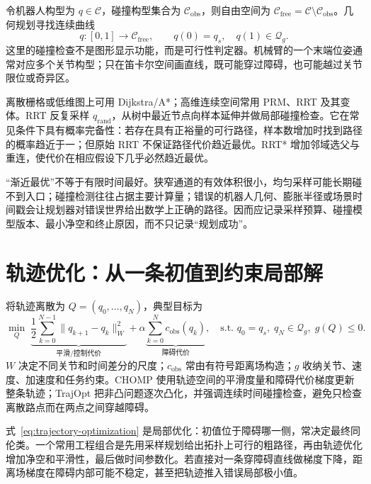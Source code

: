 令机器人构型为 $q\in\mathcal C$，碰撞构型集合为 $\mathcal C_{\mathrm{obs}}$，则自由空间为 $\mathcal C_{\mathrm{free}}=\mathcal C\setminus\mathcal C_{\mathrm{obs}}$。几何规划寻找连续曲线
\begin{equation}
q:[0,1]\rightarrow\mathcal C_{\mathrm{free}},\qquad q(0)=q_s,\quad q(1)\in\mathcal Q_g.
\label{eq:geometric-path}
\end{equation}
这里的碰撞检查不是图形显示功能，而是可行性判定器。机械臂的一个末端位姿通常对应多个关节构型；只在笛卡尔空间画直线，既可能穿过障碍，也可能越过关节限位或奇异区。

离散栅格或低维图上可用 Dijkstra/A*；高维连续空间常用 PRM、RRT 及其变体。RRT 反复采样 $q_{\mathrm{rand}}$，从树中最近节点向样本延伸并做局部碰撞检查。它在常见条件下具有概率完备性：若存在具有正裕量的可行路径，样本数增加时找到路径的概率趋近于一；但原始 RRT 不保证路径代价趋近最优。RRT* 增加邻域选父与重连，使代价在相应假设下几乎必然趋近最优\cite{karaman2011sampling}。

“渐近最优”不等于有限时间最好。狭窄通道的有效体积很小，均匀采样可能长期碰不到入口；碰撞检测往往占据主要计算量；错误的机器人几何、膨胀半径或场景时间戳会让规划器对错误世界给出数学上正确的路径。因而应记录采样预算、碰撞模型版本、最小净空和终止原因，而不只记录“规划成功”。

\section{轨迹优化：从一条初值到约束局部解}

将轨迹离散为 $Q=(q_0,\ldots,q_N)$，典型目标为
\begin{equation}
\min_Q\;\underbrace{\frac12\sum_{k=0}^{N-1}\|q_{k+1}-q_k\|_W^2}_{\text{平滑/控制代价}}
+\alpha\underbrace{\sum_{k=0}^{N}c_{\mathrm{obs}}(q_k)}_{\text{障碍代价}},
\quad\text{s.t. }q_0=q_s,\;q_N\in\mathcal Q_g,\;g(Q)\le0.
\label{eq:trajectory-optimization}
\end{equation}
$W$ 决定不同关节和时间差分的尺度；$c_{\mathrm{obs}}$ 常由有符号距离场构造；$g$ 收纳关节、速度、加速度和任务约束。CHOMP 使用轨迹空间的平滑度量和障碍代价梯度更新整条轨迹\cite{ratliff2009chomp}；TrajOpt 把非凸问题逐次凸化，并强调连续时间碰撞检查，避免只检查离散路点而在两点之间穿越障碍\cite{schulman2014motion}。

式~\eqref{eq:trajectory-optimization} 是局部优化：初值位于障碍哪一侧，常决定最终同伦类。一个常用工程组合是先用采样规划给出拓扑上可行的粗路径，再由轨迹优化增加净空和平滑性，最后做时间参数化。若直接对一条穿障碍直线做梯度下降，距离场梯度在障碍内部可能不稳定，甚至把轨迹推入错误局部极小值。

